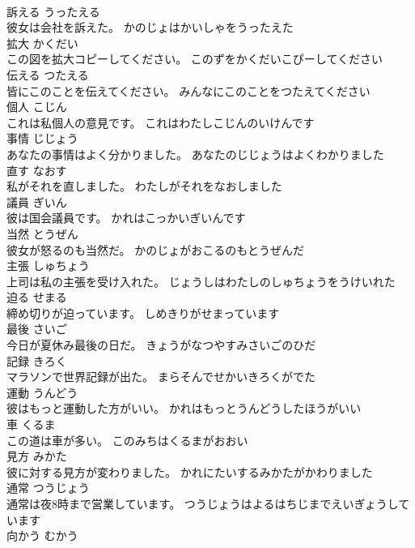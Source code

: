 \documentclass[8pt]{extreport}
\begin{document}
\begin{CJK}{UTF8}{min}
\\	訴える	うったえる	
\\	彼女は会社を訴えた。	かのじょはかいしゃをうったえた	
\\	拡大	かくだい	
\\	この図を拡大コピーしてください。	このずをかくだいこぴーしてください	
\\	伝える	つたえる	
\\	皆にこのことを伝えてください。	みんなにこのことをつたえてください	
\\	個人	こじん	
\\	これは私個人の意見です。	これはわたしこじんのいけんです	
\\	事情	じじょう	
\\	あなたの事情はよく分かりました。	あなたのじじょうはよくわかりました	
\\	直す	なおす	
\\	私がそれを直しました。	わたしがそれをなおしました	
\\	議員	ぎいん	
\\	彼は国会議員です。	かれはこっかいぎいんです	
\\	当然	とうぜん	
\\	彼女が怒るのも当然だ。	かのじょがおこるのもとうぜんだ	
\\	主張	しゅちょう	
\\	上司は私の主張を受け入れた。	じょうしはわたしのしゅちょうをうけいれた	
\\	迫る	せまる	
\\	締め切りが迫っています。	しめきりがせまっています	
\\	最後	さいご	
\\	今日が夏休み最後の日だ。	きょうがなつやすみさいごのひだ	
\\	記録	きろく	
\\	マラソンで世界記録が出た。	まらそんでせかいきろくがでた	
\\	運動	うんどう	
\\	彼はもっと運動した方がいい。	かれはもっとうんどうしたほうがいい	
\\	車	くるま	
\\	この道は車が多い。	このみちはくるまがおおい	
\\	見方	みかた	
\\	彼に対する見方が変わりました。	かれにたいするみかたがかわりました	
\\	通常	つうじょう	
\\	通常は夜8時まで営業しています。	つうじょうはよるはちじまでえいぎょうしています	
\\	向かう	むかう	

\end{CJK}
\end{document}
